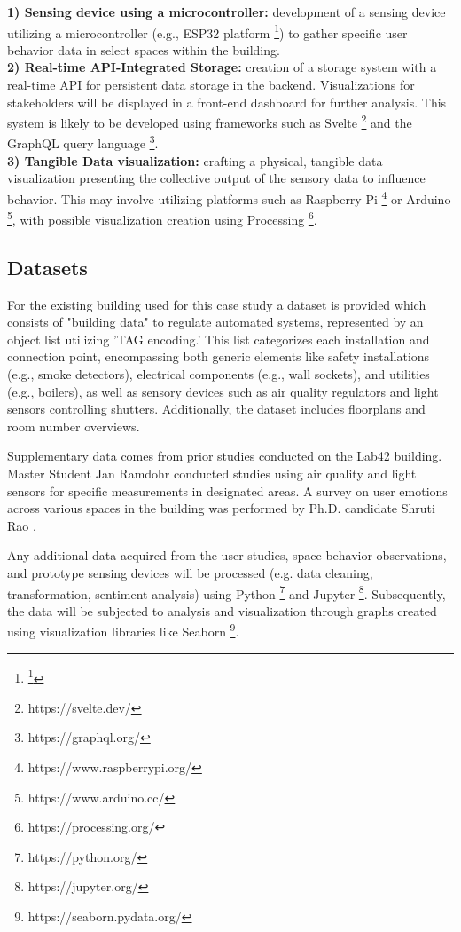 \textbf{1) Sensing device using a microcontroller: } development of a sensing device utilizing a microcontroller (e.g., ESP32 platform \footnote{\footnote{https://www.espressif.com/en/products/socs/esp32}}) to gather specific user behavior data in select spaces within the building. \\
\textbf{2) Real-time API-Integrated Storage: } creation of a storage system with a real-time API for persistent data storage in the backend. Visualizations for stakeholders will be displayed in a front-end dashboard for further analysis. This system is likely to be developed using frameworks such as Svelte \footnote{https://svelte.dev/} and the GraphQL query language \footnote{https://graphql.org/}.\\
\textbf{3) Tangible Data visualization: } crafting a physical, tangible data visualization presenting the collective output of the sensory data to influence behavior. This may involve utilizing platforms such as Raspberry Pi \footnote{https://www.raspberrypi.org/} or Arduino \footnote{https://www.arduino.cc/}, with possible visualization creation using Processing \footnote{https://processing.org/}.


\subsection{Datasets}
For the existing building used for this case study a dataset is provided which consists of "building data" to regulate automated systems, represented by an object list utilizing 'TAG encoding.' This list categorizes each installation and connection point, encompassing both generic elements like safety installations (e.g., smoke detectors), electrical components (e.g., wall sockets), and utilities (e.g., boilers), as well as sensory devices such as air quality regulators and light sensors controlling shutters. Additionally, the dataset includes floorplans and room number overviews.

Supplementary data comes from prior studies conducted on the Lab42 building. Master Student Jan Ramdohr conducted studies using air quality and light sensors for specific measurements in designated areas\cite{sensing}. A survey on user emotions across various spaces in the building was performed by Ph.D. candidate Shruti Rao \cite{emotion}.

Any additional data acquired from the user studies, space behavior observations, and prototype sensing devices will be processed (e.g. data cleaning, transformation, sentiment analysis) using Python \footnote{https://python.org/} and Jupyter \footnote{https://jupyter.org/}. Subsequently, the data will be subjected to analysis and visualization through graphs created using visualization libraries like Seaborn \footnote{https://seaborn.pydata.org/}.
